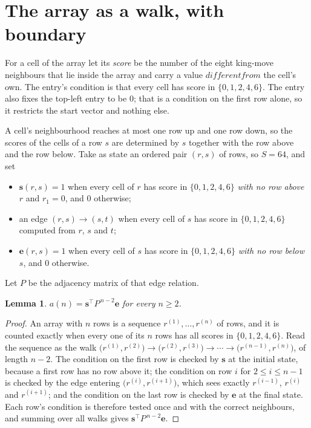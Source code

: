 \documentclass[11pt,a4paper]{article}
\theoremstyle{plain}
\newtheorem{lemma}[theorem]{Lemma}
\theoremstyle{definition}
\begin{document}
\section{The array as a walk, with boundary}

For a cell of the array let its \emph{score} be the number of the eight king-move neighbours that lie inside
the array and carry a value $different from$ the cell's own. The entry's condition is that every cell
has score in $\{0,1,2,4,6\}$. The entry also fixes the top-left entry to be $0$; that is a condition on the first row alone, so it restricts the start vector and nothing else.

A cell's neighbourhood reaches at most one row up and one row down, so the scores of the
cells of a row $s$ are determined by $s$ together with the row above and the row below.
Take as state an ordered pair $(r,s)$ of rows, so $S=64$, and set
\begin{itemize}
\item $\mathbf{s}(r,s)=1$ when every cell of $r$ has score in $\{0,1,2,4,6\}$ \emph{with no row
above $r$} and $r_1=0$, and $0$ otherwise;
\item an edge $(r,s)\to(s,t)$ when every cell of $s$ has score in $\{0,1,2,4,6\}$ computed from
$r$, $s$ and $t$;
\item $\mathbf{e}(r,s)=1$ when every cell of $s$ has score in $\{0,1,2,4,6\}$ \emph{with no row
below $s$}, and $0$ otherwise.
\end{itemize}
Let $P$ be the adjacency matrix of that edge relation.

\begin{lemma}\label{lem:walk}
$a(n)=\mathbf{s}^{\!\top}P^{\,n-2}\mathbf{e}$ for every $n\ge2$.
\end{lemma}

\begin{proof}
An array with $n$ rows is a sequence $r^{(1)},\dots,r^{(n)}$ of rows, and it is counted
exactly when every one of its $n$ rows has all scores in $\{0,1,2,4,6\}$. Read the sequence as the
walk $\bigl(r^{(1)},r^{(2)}\bigr)\to\bigl(r^{(2)},r^{(3)}\bigr)\to\cdots\to
\bigl(r^{(n-1)},r^{(n)}\bigr)$, of length $n-2$. The condition on the first row is
checked by $\mathbf{s}$ at the initial state, because a first row has no row above it; the
condition on row $i$ for $2\le i\le n-1$ is checked by the edge entering
$\bigl(r^{(i)},r^{(i+1)}\bigr)$, which sees exactly $r^{(i-1)}$, $r^{(i)}$ and
$r^{(i+1)}$; and the condition on the last row is checked by $\mathbf{e}$ at the final
state. Each row's condition is therefore tested once and with the correct neighbours, and
summing over all walks gives $\mathbf{s}^{\!\top}P^{\,n-2}\mathbf{e}$.
\end{proof}
\end{document}
